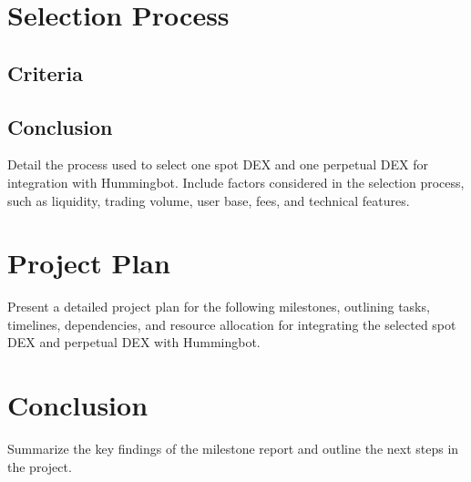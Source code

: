\documentclass{scrreport}
\begin{document}
\section{Selection Process}
\subsection[]{Criteria}
\subsection[]{Conclusion}

Detail the process used to select one spot DEX and one perpetual DEX for integration with Hummingbot. Include factors considered in the selection process, such as liquidity, trading volume, user base, fees, and technical features.

\section{Project Plan}
Present a detailed project plan for the following milestones, outlining tasks, timelines, dependencies, and resource allocation for integrating the selected spot DEX and perpetual DEX with Hummingbot.

\section{Conclusion}
Summarize the key findings of the milestone report and outline the next steps in the project.
\end{document}
